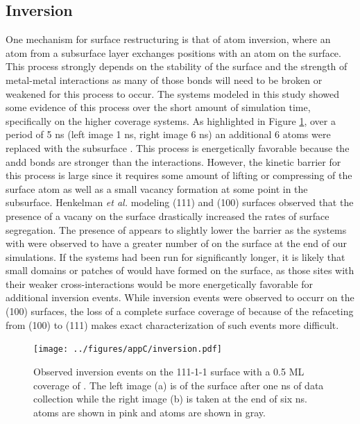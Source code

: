 \subsection{Inversion}
One mechanism for surface restructuring is that of atom inversion, where an
atom from a subsurface layer exchanges positions with an atom on the surface.
This process strongly depends on the stability of the surface and the strength
of metal-metal interactions as many of those bonds will need to be broken or
weakened for this process to occur.  The  systems modeled in this
study showed some evidence of this process over the short amount of simulation
time, specifically on the higher  coverage systems. As highlighted in
Figure \ref{fig:inversion}, over a period of 5 ns (left image 1 ns, right image
6 ns) an additional 6  atoms were replaced with the subsurface .
This process is energetically favorable because the  andd
 bonds are stronger than the  interactions.
However, the kinetic barrier for this process is large since it requires some
amount of lifting or compressing of the surface atom as well as a small vacancy
formation at some point in the subsurface. Henkelman {\em et al.} modeling
(111) and (100)  surfaces observed that the presence of a vacany on
the surface drastically increased the rates of surface
segregation.\citep{Kim:2013mi} The presence of  appears to slightly
lower the barrier as the systems with  were observed to have a greater
number of  on the surface at the end of our simulations. If the systems
had been run for significantly longer, it is likely that small domains or
patches of  would have formed on the surface, as those sites with their
weaker cross-interactions would be more energetically favorable for additional
inversion events. While inversion events were observed to occurr on the (100)
surfaces, the loss of a complete surface coverage of  because of the
refaceting from (100) to (111) makes exact characterization of such events more difficult.


\begin{figure}[p!]
\centering
\texttt{[image: ../figures/appC/inversion.pdf]}
\caption{Observed inversion events on the 111-1-1 surface with a
0.5 ML coverage of . The left image (a) is of the surface after one ns
of data collection while the right image (b) is taken at the end of six ns.
 atoms are shown in pink and  atoms are shown in gray.}
\label{fig:inversion}
\end{figure}


